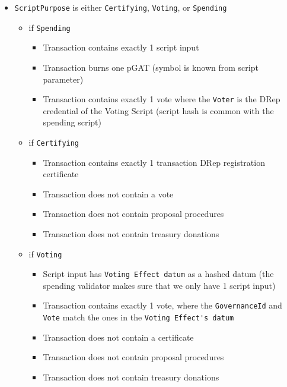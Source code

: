 \documentclass{article}
\begin{document}
\begin{itemize}
  \item \verb|ScriptPurpose| is either \verb|Certifying|, \verb|Voting|, or \verb|Spending|
        \begin{itemize}
          \item if \verb|Spending|
                \begin {itemize}

          \item Transaction contains exactly 1 script input
          \item Transaction burns one pGAT (symbol is known from script parameter)
          \item Transaction contains exactly 1 vote where the \verb|Voter| is the DRep credential of the Voting Script (script hash is common with the spending script)
        \end{itemize}
  \item if \verb|Certifying|
        \begin{itemize}
          \item Transaction contains exactly 1 transaction DRep registration certificate
          \item Transaction does not contain a vote
          \item Transaction does not contain proposal procedures
          \item Transaction does not contain treasury donations
        \end{itemize}
  \item if \verb|Voting|
        \begin{itemize}
          \item Script input has \verb|Voting Effect datum| as a hashed datum (the spending validator makes sure that we only have 1 script input)
          \item Transaction contains exactly 1 vote, where the \verb|GovernanceId| and \verb|Vote| match the ones in the \verb|Voting Effect's datum|
          \item Transaction does not contain a certificate
          \item Transaction does not contain proposal procedures
          \item Transaction does not contain treasury donations
        \end{itemize}


\end{itemize}
\end{itemize}
\end{document}
